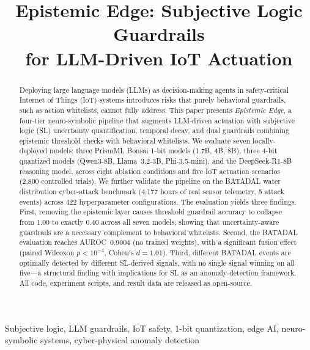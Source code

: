 \documentclass[conference]{IEEEtran}
\begin{document}
\title{Epistemic Edge: Subjective Logic Guardrails\\for LLM-Driven IoT Actuation}

\author{
\and
{}
}

\maketitle

\begin{abstract}
Deploying large language models (LLMs) as decision-making agents in safety-critical Internet of Things (IoT) systems introduces risks that purely behavioral guardrails, such as action whitelists, cannot fully address.
This paper presents \textit{Epistemic Edge}, a four-tier neuro-symbolic pipeline that augments LLM-driven actuation with subjective logic (SL) uncertainty quantification, temporal decay, and dual guardrails combining epistemic threshold checks with behavioral whitelists.
We evaluate seven locally-deployed models: three PrismML Bonsai 1-bit models (1.7B, 4B, 8B), three 4-bit quantized models (Qwen3-8B, Llama~3.2-3B, Phi-3.5-mini), and the DeepSeek-R1-8B reasoning model, across eight ablation conditions and five IoT actuation scenarios (2{,}800 controlled trials).
We further validate the pipeline on the BATADAL water distribution cyber-attack benchmark (4{,}177 hours of real sensor telemetry, 5 attack events) across 422 hyperparameter configurations.
The evaluation yields three findings.
First, removing the epistemic layer causes threshold guardrail accuracy to collapse from 1.00 to exactly 0.40 across all seven models, showing that uncertainty-aware guardrails are a necessary complement to behavioral whitelists.
Second, the BATADAL evaluation reaches AUROC~0.9004 (no trained weights), with a significant fusion effect (paired Wilcoxon $p<10^{-4}$, Cohen's $d{=}1.01$).
Third, different BATADAL events are optimally detected by different SL-derived signals, with no single signal winning on all five---a structural finding with implications for SL as an anomaly-detection framework.
All code, experiment scripts, and result data are released as open-source.
\end{abstract}

\begin{IEEEkeywords}
Subjective logic, LLM guardrails, IoT safety, 1-bit quantization, edge AI, neuro-symbolic systems, cyber-physical anomaly detection
\end{IEEEkeywords}
\end{document}
